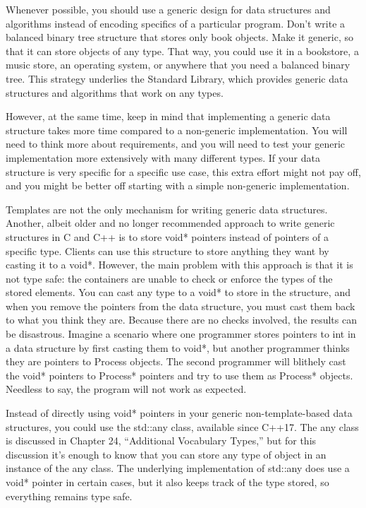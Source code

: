 Whenever possible, you should use a generic design for data structures and algorithms instead of encoding specifics of a particular program. Don’t write a balanced binary tree structure that stores only book objects. Make it generic, so that it can store objects of any type. That way, you could use it in a bookstore, a music store, an operating system, or anywhere that you need a balanced binary tree.
This strategy underlies the Standard Library, which provides generic data structures and algorithms that work on any types.

However, at the same time, keep in mind that implementing a generic data structure takes more time compared to a non-generic implementation. You will need to think more about requirements, and you will need to test your generic implementation more extensively with many different types. If your data structure is very specific for a specific use case, this extra effort might not pay off, and you might be better off starting with a simple non-generic implementation.


Templates are not the only mechanism for writing generic data structures. Another, albeit older and no longer recommended approach to write generic structures in C and C++ is to store void* pointers instead of pointers of a specific type. Clients can use this structure to store anything they want by casting it to a void*. However, the main problem with this approach is that it is not type safe: the containers are unable to check or enforce the types of the stored elements. You can cast any type to a void* to store in the structure, and when you remove the pointers from the data structure, you must cast them back to what you think they are. Because there are no checks involved, the results can be disastrous. Imagine a scenario where one programmer stores pointers to int in a data structure by first casting them to void*, but another programmer thinks they are pointers to Process objects. The second programmer will blithely cast the void* pointers to Process* pointers and try to use them as Process* objects. Needless to say, the program will not work as expected.

Instead of directly using void* pointers in your generic non-template-based data structures, you could use the std::any class, available since C++17. The any class is discussed in Chapter 24, “Additional Vocabulary Types,” but for this discussion it’s enough to know that you can store any type of object in an instance of the any class. The underlying implementation of std::any does use a void* pointer in certain cases, but it also keeps track of the type stored, so everything remains type safe.

